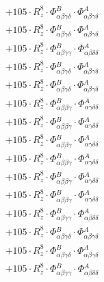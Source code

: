 \documentclass{article}
\begin{document}
\begin{subequations}
\begin{gather}
\begin{array}{c}
 \\[0.2em] 		 + 105 \cdot R_{z}^{8} \cdot \Phi{}^{B}_{\alpha{}\beta{}\gamma{}\delta{}} \cdot \Phi{}^{A}_{\alpha{}\beta{}\gamma{}\delta{}} 
 \\[0.2em] 		 + 105 \cdot R_{z}^{8} \cdot \Phi{}^{B}_{\alpha{}\beta{}\gamma{}\delta{}} \cdot \Phi{}^{A}_{\alpha{}\beta{}\gamma{}\delta{}} 
 \\[0.2em] 		 + 105 \cdot R_{z}^{8} \cdot \Phi{}^{B}_{\alpha{}\beta{}\gamma{}\gamma{}} \cdot \Phi{}^{A}_{\alpha{}\beta{}\delta{}\delta{}} 
 \\[0.2em] 		 + 105 \cdot R_{z}^{8} \cdot \Phi{}^{B}_{\alpha{}\beta{}\gamma{}\delta{}} \cdot \Phi{}^{A}_{\alpha{}\beta{}\gamma{}\delta{}} 
 \\[0.2em] 		 + 105 \cdot R_{z}^{8} \cdot \Phi{}^{B}_{\alpha{}\beta{}\gamma{}\delta{}} \cdot \Phi{}^{A}_{\alpha{}\beta{}\gamma{}\delta{}} 
 \\[0.2em] 		 + 105 \cdot R_{z}^{8} \cdot \Phi{}^{B}_{\alpha{}\beta{}\beta{}\gamma{}} \cdot \Phi{}^{A}_{\alpha{}\gamma{}\delta{}\delta{}} 
 \\[0.2em] 		 + 105 \cdot R_{z}^{8} \cdot \Phi{}^{B}_{\alpha{}\beta{}\beta{}\gamma{}} \cdot \Phi{}^{A}_{\alpha{}\gamma{}\delta{}\delta{}} 
 \\[0.2em] 		 + 105 \cdot R_{z}^{8} \cdot \Phi{}^{B}_{\alpha{}\beta{}\beta{}\gamma{}} \cdot \Phi{}^{A}_{\alpha{}\gamma{}\delta{}\delta{}} 
 \\[0.2em] 		 + 105 \cdot R_{z}^{8} \cdot \Phi{}^{B}_{\alpha{}\beta{}\beta{}\gamma{}} \cdot \Phi{}^{A}_{\alpha{}\gamma{}\delta{}\delta{}} 
 \\[0.2em] 		 + 105 \cdot R_{z}^{8} \cdot \Phi{}^{B}_{\alpha{}\beta{}\beta{}\gamma{}} \cdot \Phi{}^{A}_{\alpha{}\gamma{}\delta{}\delta{}} 
 \\[0.2em] 		 + 105 \cdot R_{z}^{8} \cdot \Phi{}^{B}_{\alpha{}\beta{}\beta{}\gamma{}} \cdot \Phi{}^{A}_{\alpha{}\gamma{}\delta{}\delta{}} 
 \\[0.2em] 		 + 105 \cdot R_{z}^{8} \cdot \Phi{}^{B}_{\alpha{}\beta{}\gamma{}\gamma{}} \cdot \Phi{}^{A}_{\alpha{}\beta{}\delta{}\delta{}} 
 \\[0.2em] 		 + 105 \cdot R_{z}^{8} \cdot \Phi{}^{B}_{\alpha{}\beta{}\gamma{}\delta{}} \cdot \Phi{}^{A}_{\alpha{}\beta{}\gamma{}\delta{}} 
 \\[0.2em] 		 + 105 \cdot R_{z}^{8} \cdot \Phi{}^{B}_{\alpha{}\beta{}\gamma{}\delta{}} \cdot \Phi{}^{A}_{\alpha{}\beta{}\gamma{}\delta{}} 
 \\[0.2em] 		 + 105 \cdot R_{z}^{8} \cdot \Phi{}^{B}_{\alpha{}\beta{}\gamma{}\gamma{}} \cdot \Phi{}^{A}_{\alpha{}\beta{}\delta{}\delta{}} 

\end{array}
\end{gather}
\end{subequations}
\end{document}
